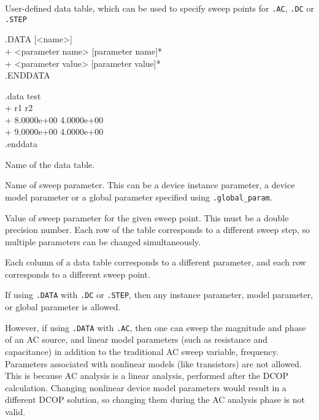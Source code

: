 


User-defined data table, which can be used to specify sweep points for \texttt{.AC}, \texttt{.DC} or \texttt{.STEP}

\begin{Command}

\format
.DATA [<name>] \\
+ <parameter name> [parameter name]* \\
+ <parameter value> [parameter value]* \\
.ENDDATA

\examples
.data test \\
+ r1   r2 \\
+ 8.0000e+00  4.0000e+00 \\
+ 9.0000e+00  4.0000e+00 \\
.enddata

\arguments

\begin{Arguments}
Name of the data table.

Name of sweep parameter.  This can be a device instance parameter, a device model parameter or a global parameter specified using \texttt{.global\_param}.

Value of sweep parameter for the given sweep point.  This must be a double precision number.  Each row of the table corresponds to a different sweep step, so multiple parameters can be changed simultaneously.

\end{Arguments}

\comments

Each column of a data table corresponds to a different parameter, and each row corresponds to a different sweep point.

If using \texttt{.DATA} with \texttt{.DC} or \texttt{.STEP}, then any instance parameter, model parameter, or global parameter is allowed.

  However, if using \texttt{.DATA} with \texttt{.AC}, then one can sweep the magnitude and phase of an AC source, and linear model parameters (such as resistance and capacitance) in addition to the traditional AC sweep variable, frequency.  Parameters associated with nonlinear models (like transistors) are not allowed.  This is because AC analysis is a linear analysis, performed after the DCOP calculation.  Changing nonlinear device model parameters would result in a different DCOP solution, so changing them during the AC analysis phase is not valid.

\end{Command}
